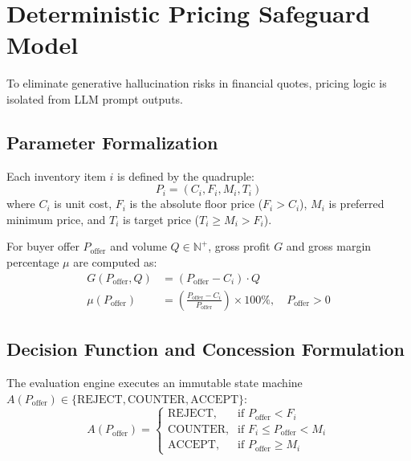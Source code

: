\documentclass[conference]{IEEEtran}
\begin{document}
\section{Deterministic Pricing Safeguard Model}
\label{sec:pricing}

To eliminate generative hallucination risks in financial quotes, pricing logic is isolated from LLM prompt outputs.

\subsection{Parameter Formalization}
Each inventory item $i$ is defined by the quadruple:
\begin{equation}
    P_i = (C_i, F_i, M_i, T_i)
\end{equation}
where $C_i$ is unit cost, $F_i$ is the absolute floor price ($F_i > C_i$), $M_i$ is preferred minimum price, and $T_i$ is target price ($T_i \ge M_i > F_i$).

For buyer offer $P_{\text{offer}}$ and volume $Q \in \mathbb{N}^+$, gross profit $G$ and gross margin percentage $\mu$ are computed as:
\begin{align}
    G(P_{\text{offer}}, Q) &= (P_{\text{offer}} - C_i) \cdot Q \\
    \mu(P_{\text{offer}}) &= \left(\frac{P_{\text{offer}} - C_i}{P_{\text{offer}}}\right) \times 100\%, \quad P_{\text{offer}} > 0
\end{align}

\subsection{Decision Function and Concession Formulation}
The evaluation engine executes an immutable state machine $A(P_{\text{offer}}) \in \{\text{REJECT}, \text{COUNTER}, \text{ACCEPT}\}$:
\begin{equation}
    A(P_{\text{offer}}) = 
    \begin{cases}
        \text{REJECT}, & \text{if } P_{\text{offer}} < F_i \\
        \text{COUNTER}, & \text{if } F_i \le P_{\text{offer}} < M_i \\
        \text{ACCEPT}, & \text{if } P_{\text{offer}} \ge M_i
    \end{cases}
\end{equation}
\end{document}

